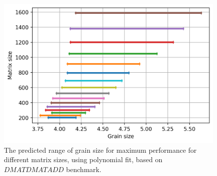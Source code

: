\vspace{\baselineskip}	
\begin{figure}[H]	
	\centering\includegraphics[scale=.75]{images/polyfit/fig_all_sizes_range_silver.png}			
	\caption{The predicted range of grain size for maximum performance for different matrix sizes, using polynomial fit, based on $DMATDMATADD$ benchmark.}
	\label{fig20}	
\end{figure} 